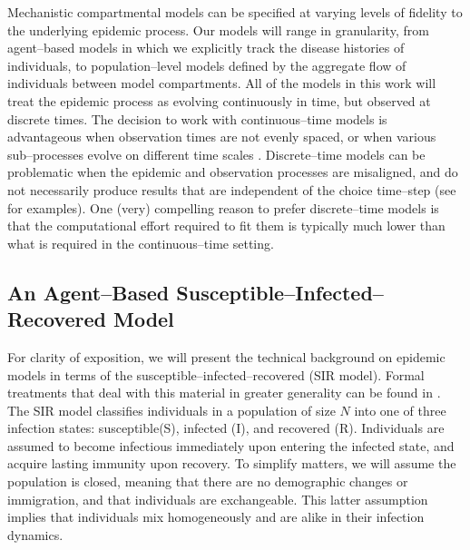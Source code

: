 Mechanistic compartmental models can be specified at varying levels of fidelity to the underlying epidemic process. Our models will range in granularity, from agent--based models in which we explicitly track the disease histories of individuals, to population--level models defined by the aggregate flow of individuals between model compartments. All of the models in this work will treat the epidemic process as evolving continuously in time, but observed at discrete times. The decision to work with continuous--time models is advantageous when observation times are not evenly spaced, or when various sub--processes evolve on different time scales \cite{glass2003,shelton2014}. Discrete--time models can be problematic when the epidemic and observation processes are misaligned, and do not necessarily produce results that are independent of the choice time--step (see \cite{shelton2014} for examples). One (very) compelling reason to prefer discrete--time models is that the computational effort required to fit them is typically much lower than what is required in the continuous--time setting. 

\subsection{An Agent--Based Susceptible--Infected--Recovered Model}
\label{subsec:sir_individual_mod}
For clarity of exposition, we will present the technical background on epidemic models in terms of the susceptible--infected--recovered (SIR model). Formal treatments that deal with this material in greater generality can be found in \cite{andersson2000stochastic,britton2018,brauer2008compartmental,fuchs2013inference,wilkinson2011stochastic}. The SIR model classifies individuals in a population of size $ N $ into one of three infection states: susceptible(S), infected (I), and recovered (R). Individuals are assumed to become infectious immediately upon entering the infected state, and acquire lasting immunity upon recovery. To simplify matters, we will assume the population is closed, meaning that there are no demographic changes or immigration, and that individuals are exchangeable. This latter assumption implies that individuals mix homogeneously and are alike in their infection dynamics. 

